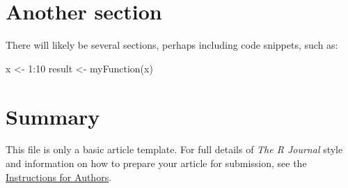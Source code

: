 \section{Another section}

There will likely be several sections, perhaps including code snippets, such as:

\begin{example}
  x <- 1:10
  result <- myFunction(x)
\end{example}

\section{Summary}

This file is only a basic article template. For full details of \emph{The R Journal} style and information on how to prepare your article for submission, see the \href{https://journal.r-project.org/share/author-guide.pdf}{Instructions for Authors}.



\address{Author One\\
  Affiliation\\
  Address\\
  Country\\
  (ORCiD if desired)\\
  }

\address{Author Two\\
  Affiliation\\
  Address\\
  Country\\
  (ORCiD if desired)\\
  }

\address{Author Three\\
  Affiliation\\
  Address\\
  Country\\
  (ORCiD if desired)\\
  }
